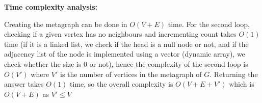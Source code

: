 \documentclass[answers]{exam}
\begin{document}
\begin{questions}
\begin{solution}
\textbf{Time complexity analysis:}

Creating the metagraph can be done in $O(V + E)$ time. For the second loop, checking if a given vertex has no neighbours and incrementing count takes $O(1)$ time (if it is a linked list, we check if the
    head is a null node or not, and if the adjacency list of the node is implemented using a vector (dynamic array), we check whether the size is $0$ or not), hence the complexity of the second loop is
    $O(V')$ where $V'$ is the number of vertices in the metagraph of $G$. Returning the answer takes $O(1)$ time, so the overall complexity is $O(V + E + V')$ which is $O(V + E)$ as $V' \le V$
\end{solution}

\end{questions}
\end{document}
